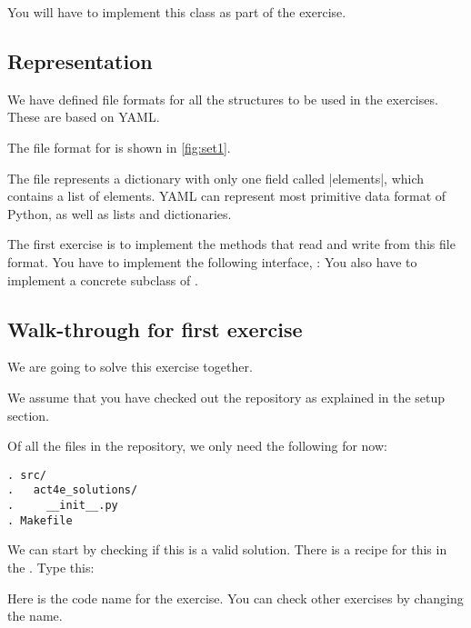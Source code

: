 You will have to implement this class as part of the exercise.


\subsection*{Representation}

We have defined file formats for all the structures to be used in the exercises.
These are based on YAML\@.

The file format for  is shown in \cref{fig:set1}.


The file represents a dictionary with only one field called \pystr|elements|, which contains a list of elements.
YAML can represent most primitive data format of Python, as well as lists and dictionaries.

\begin{exercise}
  \label{ex:setrepr}
  The first exercise is to implement the methods that read and write from this file format.
  You have to implement the following interface, :
%
  You also have to implement a concrete subclass of .
\end{exercise}

\subsection{Walk-through for first exercise}

We are going to solve this exercise together.

We assume that you have checked out the repository as explained in the setup section.

Of all the files in the repository, we only need the following for now:

\begin{verbatim}
. src/
.   act4e_solutions/
.     __init__.py
. Makefile
\end{verbatim}


We can start by checking if this is a valid solution. There is a recipe for this in the .
Type this:


Here  is the code name for the exercise. You can check other exercises by changing the name.

